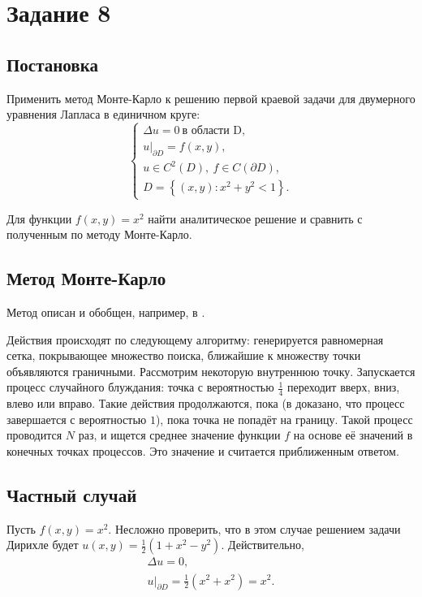 \documentclass[12pt, a4paper]{article}
\begin{document}

\newpage

\section{Задание 8}
\subsection{Постановка}
Применить метод Монте-Карло к решению первой краевой задачи для двумерного уравнения Лапласа в единичном круге:
\[\begin{cases}
\Delta u = 0\ \text {в области D}, \\
\left. u \right|_{\partial D} = f(x,y), \\
u\in C^2(D),\ f\in C(\partial D), \\
D = \left\{ \left( x,y \right)\colon x^2+y^2<1 \right\}.
\end{cases}\]

Для функции $f(x,y)=x^2$ найти аналитическое решение и сравнить с полученным по методу Монте-Карло. 

\subsection{Метод Монте-Карло}
Метод описан и обобщен, например, в \cite{Buslenko_Shreider}.

Действия происходят по следующему алгоритму: генерируется равномерная сетка, покрывающее множество поиска, ближайшие к множеству точки объявляются граничными. Рассмотрим некоторую внутреннюю точку. Запускается процесс случайного блуждания: точка с вероятностью $\frac{1}{4}$ переходит вверх, вниз, влево или вправо. Такие действия продолжаются, пока (в \cite{shiryaev} доказано, что процесс завершается с вероятностью $1$), пока точка не попадёт на границу. Такой процесс проводится $N$ раз, и ищется среднее значение функции $f$ на основе её значений в конечных точках процессов. Это значение и считается приближенным ответом.


\subsection{Частный случай}
Пусть $f(x,y) = x^2$. Несложно проверить, что в этом случае решением задачи Дирихле будет $u(x,y)=\frac{1}{2}\left( 1+x^2-y^2 \right)$. Действительно, 
\begin{gather*}
\Delta u = 0, \\
\left. u\right| _{\partial D} = \frac 12 \left( x^2 + x^2\right) = x^2.
\end{gather*} 
\end{document}
